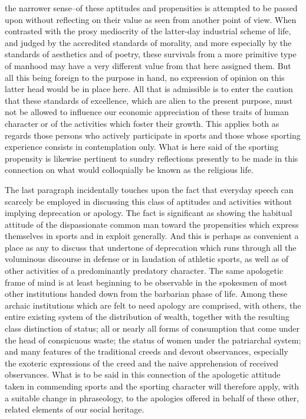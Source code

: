 \documentclass[12pt]{report}
\begin{document}
the narrower sense--of these aptitudes and propensities is attempted to
be passed upon without reflecting on their value as seen from another
point of view. When contrasted with the prosy mediocrity of the
latter-day industrial scheme of life, and judged by the accredited
standards of morality, and more especially by the standards of
aesthetics and of poetry, these survivals from a more primitive type of
manhood may have a very different value from that here assigned them.
But all this being foreign to the purpose in hand, no expression
of opinion on this latter head would be in place here. All that is
admissible is to enter the caution that these standards of excellence,
which are alien to the present purpose, must not be allowed to influence
our economic appreciation of these traits of human character or of the
activities which foster their growth. This applies both as regards those
persons who actively participate in sports and those whose sporting
experience consists in contemplation only. What is here said of
the sporting propensity is likewise pertinent to sundry reflections
presently to be made in this connection on what would colloquially be
known as the religious life.

The last paragraph incidentally touches upon the fact that everyday
speech can scarcely be employed in discussing this class of aptitudes
and activities without implying deprecation or apology. The fact is
significant as showing the habitual attitude of the dispassionate common
man toward the propensities which express themselves in sports and in
exploit generally. And this is perhaps as convenient a place as any
to discuss that undertone of deprecation which runs through all the
voluminous discourse in defense or in laudation of athletic sports, as
well as of other activities of a predominantly predatory character. The
same apologetic frame of mind is at least beginning to be observable in
the spokesmen of most other institutions handed down from the barbarian
phase of life. Among these archaic institutions which are felt to need
apology are comprised, with others, the entire existing system of the
distribution of wealth, together with the resulting class distinction of
status; all or nearly all forms of consumption that come under the head
of conspicuous waste; the status of women under the patriarchal system;
and many features of the traditional creeds and devout observances,
especially the exoteric expressions of the creed and the naive
apprehension of received observances. What is to be said in this
connection of the apologetic attitude taken in commending sports and
the sporting character will therefore apply, with a suitable change in
phraseology, to the apologies offered in behalf of these other, related
elements of our social heritage.
\end{document}
